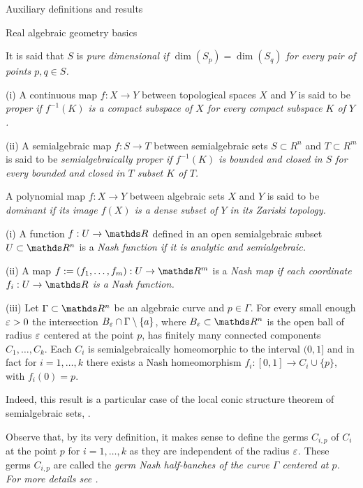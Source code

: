 \documentclass[11pt, a4paper, english, twoside, notitlepage, openright]{report}
\begin{document}
\begin{chapter}{Auxiliary definitions and results}
\begin{section}{Real algebraic geometry basics}
\begin{definition}
	It is said that $S$ is \em pure dimensional \em if $\dim(S_p)=\dim(S_q)$ for every pair of points $p,q\in S$.
\end{definition}

\begin{definitions}\label{properMap}
	  (i) A continuous map $f:X\to Y$ between topological spaces $X$ and $Y$ is said to be \em proper \em if $f^{-1}(K)$ is a compact subspace of $X$ for every compact subspace $K$ of $Y$. 
	  
	  (ii) A semialgebraic map $f:S\to T$ between semialgebraic sets $S\subset R^n$ and $T\subset R^m$ is said to be \em semialgebraically proper \em if $f^{-1}(K)$ is bounded and closed in $S$ for every bounded and closed in $T$ subset $K$ of $T$.  
\end{definitions}

\begin{definition}\label{dominant}
	A polynomial map $f:X\to Y$ between algebraic sets $X$ and $Y$ is said to be \em dominant \em if its image $f(X)$ is a dense subset of $Y$ in its Zariski topology. 
\end{definition}

\begin{definitions}\label{curveGerms}
	(i) A function $f:U\to\R$ defined in an open semialgebraic subset $U\subset\R^n$ is a \em Nash function \em if it is analytic and semialgebraic. 
	
	(ii) A map $f:=(f_1,\dots,f_m):U\to\R^m$ is a \em Nash map \em if each coordinate $f_i:U\to\R$ is a Nash function. 
	
	(iii) Let $\Gamma\subset\R^n$ be an algebraic curve and $p\in\Gamma$. For every small enough $\varepsilon>0$ the intersection $B_{\varepsilon}\cap\Gamma\setminus\{a\}$, %
where $B_{\eps}\subset\R^n$ is the open ball of radius $\varepsilon$ centered at the point $p$, has finitely many connected components $C_1,\dots,C_k$. Each $C_i$ is semialgebraically homeomorphic to the interval $(0,1]$ and in fact for $i=1,\dots,k$ there exists a Nash homeomorphism  $f_i:[0,1]\to C_i\cup\{p\}$, with $f_i(0)=p$.

Indeed, this result is a particular case of the local conic structure theorem of semialgebraic sets, \cite[IX.3.6]{bcr}. 
	
Observe that, by its very definition, it makes sense to define the germs $C_{i,p}$ of $C_i$ at the point $p$ for $i=1,\dots,k$ as they are independent of the radius $\varepsilon$. These germs  $C_{i,p}$ are called the \em germ Nash half-banches \em of the curve $\Gamma$ centered at $p$. For more details see \cite[IX.5.2]{bcr}. 
\end{definitions}


\end{section}
\end{chapter}
\end{document}
